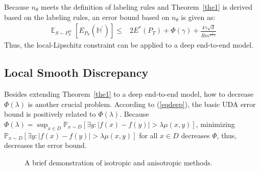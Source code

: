 \documentclass[journal,twocolumn]{IEEEtran}
\theoremstyle{definition}
\begin{document}
 Because $n_\theta$ meets the definition of labeling rules and Theorem~\ref{the1} is derived based on the labeling rules, an error bound based on $n_\theta$ is given as:
\begin{align}
\mathop{\mathbb{E}}_{S\sim P_S^m}[E_{P_T}(\mathbb{H^\prime})]\leq&2E^*(P_T)+\Phi(\gamma)+\frac{4\gamma\sqrt{d}}{Rm^{\frac{1}{d+1}}}\label{eqdeep}
\end{align}
Thus, the local-Lipschitz constraint can be applied to a deep end-to-end model.



\subsection{Local Smooth Discrepancy}

Besides extending Theorem~\ref{the1} to a deep end-to-end model, how to decrease $\Phi(\lambda)$ is another crucial problem. According to (\ref{eqdeep}), the basic UDA error bound is positively related to $\Phi(\lambda)$.  Because $\Phi(\lambda)=\sup_{x\in D}\mathbb{P}_{x\sim D}[\exists y: |f(x)-f(y)|>\lambda\mu(x,y)]$, minimizing $\mathbb{P}_{x\sim D}[\exists y: |f(x)-f(y)|>\lambda\mu(x,y)]$  for all $x\in D$ decreases $\Phi$, thus, decreases the error bound.

\begin{figure}[h]
  \centering
\caption{A brief demonstration of isotropic and anisotropic methods.}
  \label{fig:plans} \end{figure} 
\end{document}
